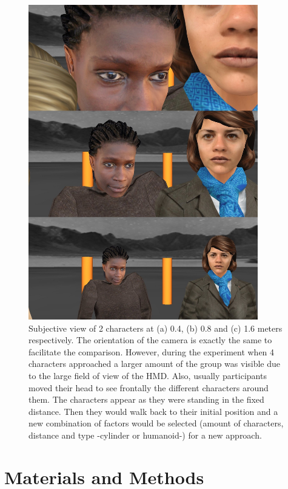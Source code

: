 \documentclass[
		twoside,openright,titlepage,numbers=noenddot,manychapters,
		headinclude,%
                footinclude=false,cleardoublepage=empty,
                BCOR=5mm,
		fontsize=11pt, %
                 enabledeprecatedfontcommands]{scrreprt}
\begin{document}
\begin{figure}[]
\begin{center}
\includegraphics[width=10cm]{figures/proxemics/distances.jpg}
\caption{  Subjective view of 2 characters at (a) 0.4, (b) 0.8 and (c) 1.6 meters respectively. The orientation of the camera is exactly the same to facilitate the comparison. However, during the experiment when 4 characters approached a larger amount of the group was visible due to the large field of view of the HMD. Also, usually participants moved their head to see frontally the different characters around them. The characters appear as they were standing in the fixed distance. Then they would walk back to their initial position and a new combination of factors would be selected (amount of characters, distance and type -cylinder or humanoid-) for a new approach.}
\label{fig_distances}
\end{center}

\end{figure} 


\section{Materials and Methods}
\end{document}
